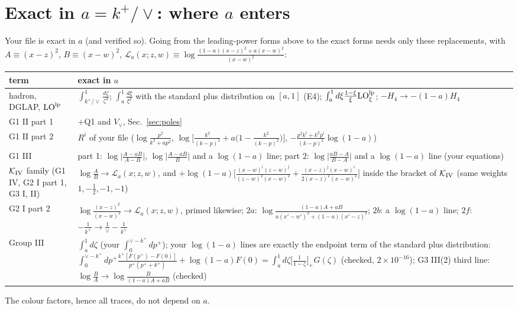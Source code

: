 \documentclass[10pt]{article}
\numberwithin{equation}{section}
\newcommand{\LO}{{\rm LO}}
\begin{document}
\section{Exact in \texorpdfstring{$a=k^+/\vee$}{a=k+/vee}: where \texorpdfstring{$a$}{a} enters}\label{sec:exact}
Your file is exact in $a$ (and verified so). Going from the leading-power forms above to the exact forms needs only these replacements, with $A\equiv(x-z)^2$, $B\equiv(x-w)^2$, $\mathcal L_a(x;z,w)\equiv\log\frac{(1-a)(x-z)^2+a(x-w)^2}{(x-w)^2}$:
\begin{center}\small
\begin{tabular}{@{}p{}p{}@{}}\toprule
term & exact in $a$\\\midrule
hadron, DGLAP, $\LO^{\rm lp}$ & $\int_{k^+/\vee}^1\frac{d\zeta}{\zeta^3}$; $\int_a^1\frac{d\xi}{\xi^2}$ with the standard plus distribution on $[a,1]$ (E4); $\int_a^1d\xi\frac{1-\xi}{\xi}\LO^{\rm lp}_\xi$; $-H_4\to-(1-a)H_4$\\
G1 II part 1 & $+$Q1 and $V_\vee$, Sec.~\ref{sec:poles}\\
G1 II part 2 & $R^i$ of your file ($\log\frac{p^2}{k^2+ap^2}$, $\log\big[\frac{k^2}{(k-p)^2}+a\big(1-\frac{k^2}{(k-p)^2}\big)\big]$, $-\frac{p^2k^i+k^2p^i}{(k-p)^2}\log(1-a)$)\\
G1 III & part 1: $\log\big|\frac{A-aB}{A-B}\big|$, $\log\big|\frac{A-aB}{B}\big|$ and a $\log(1-a)$ line; part 2: $\log\big|\frac{aB-A}{B-A}\big|$ and a $\log(1-a)$ line (your equations)\\
$\mathcal K_{\rm IV}$ family (G1 IV, G2 I part 1, G3 I, II) & $\log\frac{A}{B}\to\mathcal L_a(x;z,w)$, and $+\log(1-a)\Big[\frac{(x-w)^{i}(z-w)^{j}}{(z-w)^{2}(x-w)^{2}}+\frac{(x-z)^{j}(x-w)^{i}}{2(x-z)^{2}(x-w)^{2}}\Big]$ inside the bracket of $\mathcal K_{\rm IV}$ (same weights $1,-\frac12,-1,-1$)\\
G2 I part 2 & $\log\frac{(x-z)^2}{(x-w)^2}\to\mathcal L_a(x;z,w)$, primed likewise; $2a$: $\log\frac{(1-a)A+aB}{a(x'-w')^2+(1-a)(x'-z)^2}$; $2b$: a $\log(1-a)$ line; $2f$: $-\frac1{k^+}\to\frac1\vee-\frac1{k^+}$\\
Group III & $\int_a^1d\zeta$ (your $\int_0^{\vee-k^+}dp^+$); your $\log(1-a)$ lines are exactly the endpoint term of the standard plus distribution: $\int_0^{\vee-k^+}\!dp^+\frac{k^+[F(p^+)-F(0)]}{p^+(p^++k^+)}+\log(1-a)F(0)=\int_a^1d\zeta\big[\frac1{1-\zeta}\big]_+G(\zeta)$ (checked, $2\times10^{-16}$); G3 III(2) third line: $\log\frac BA\to\log\frac{B}{(1-a)A+aB}$ (checked)\\\bottomrule
\end{tabular}
\end{center}
The colour factors, hence all traces, do not depend on $a$.
\end{document}
